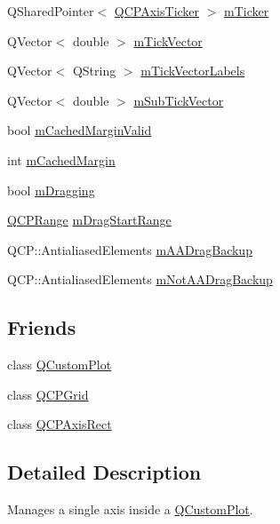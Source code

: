 \begin{DoxyCompactItemize}
\item 
Q\+Shared\+Pointer$<$ \mbox{\hyperlink{class_q_c_p_axis_ticker}{Q\+C\+P\+Axis\+Ticker}} $>$ \mbox{\hyperlink{class_q_c_p_axis_ad9c3061cbd8bec5b0755d5a0bef3b700}{m\+Ticker}}
\item 
Q\+Vector$<$ double $>$ \mbox{\hyperlink{class_q_c_p_axis_aae0f9b9973b85be601200f00f5825087}{m\+Tick\+Vector}}
\item 
Q\+Vector$<$ Q\+String $>$ \mbox{\hyperlink{class_q_c_p_axis_aeee4bd0fca3f587eafe33843d1cb4f82}{m\+Tick\+Vector\+Labels}}
\item 
Q\+Vector$<$ double $>$ \mbox{\hyperlink{class_q_c_p_axis_a28353081e0ff35c3fe5ced923a287faa}{m\+Sub\+Tick\+Vector}}
\item 
bool \mbox{\hyperlink{class_q_c_p_axis_a2cde37b6e385f47e11322df4ac1b0e9b}{m\+Cached\+Margin\+Valid}}
\item 
int \mbox{\hyperlink{class_q_c_p_axis_a48ace55cbd54f7241e7f1b06fd369b64}{m\+Cached\+Margin}}
\item 
bool \mbox{\hyperlink{class_q_c_p_axis_ad56b9be14ed8ae9b858d84bdb539b1ca}{m\+Dragging}}
\item 
\mbox{\hyperlink{class_q_c_p_range}{Q\+C\+P\+Range}} \mbox{\hyperlink{class_q_c_p_axis_a4b665f97d37727f0013b93d727e80bd2}{m\+Drag\+Start\+Range}}
\item 
Q\+C\+P\+::\+Antialiased\+Elements \mbox{\hyperlink{class_q_c_p_axis_a9c34e6f92eda5803e7ce4ea3322a6417}{m\+A\+A\+Drag\+Backup}}
\item 
Q\+C\+P\+::\+Antialiased\+Elements \mbox{\hyperlink{class_q_c_p_axis_a0be1bc05fcbf86bd9916cc8faa55dd78}{m\+Not\+A\+A\+Drag\+Backup}}
\end{DoxyCompactItemize}
\subsection*{Friends}
\begin{DoxyCompactItemize}
\item 
class \mbox{\hyperlink{class_q_c_p_axis_a1cdf9df76adcfae45261690aa0ca2198}{Q\+Custom\+Plot}}
\item 
class \mbox{\hyperlink{class_q_c_p_axis_a061e177f585549fc31f780852e2bd6fe}{Q\+C\+P\+Grid}}
\item 
class \mbox{\hyperlink{class_q_c_p_axis_acbf20ecb140f66c5fd1bc64ae0762990}{Q\+C\+P\+Axis\+Rect}}
\end{DoxyCompactItemize}


\subsection{Detailed Description}
Manages a single axis inside a \mbox{\hyperlink{class_q_custom_plot}{Q\+Custom\+Plot}}. 

